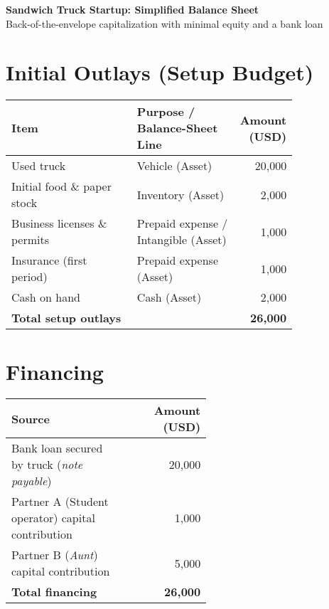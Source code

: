 \documentclass[11pt]{article}
\begin{document}
{\LARGE \textbf{Sandwich Truck Startup: Simplified Balance Sheet}}\\
{\large Back-of-the-envelope capitalization with minimal equity and a bank loan}

\section*{Initial Outlays (Setup Budget)}
\begin{tabular}{@{}p{0.44\linewidth}p{0.36\linewidth}r@{}}
\toprule
\textbf{Item} & \textbf{Purpose / Balance-Sheet Line} & \textbf{Amount (USD)}\\
\midrule
Used truck & Vehicle (Asset) & 20{,}000\\
Initial food \& paper stock & Inventory (Asset) & 2{,}000\\
Business licenses \& permits & Prepaid expense / Intangible (Asset) & 1{,}000\\
Insurance (first period) & Prepaid expense (Asset) & 1{,}000\\
Cash on hand & Cash (Asset) & 2{,}000\\
\midrule
\textbf{Total setup outlays} & & \textbf{26{,}000}\\
\bottomrule
\end{tabular}

\section*{Financing}
\begin{tabular}{@{}p{0.56\linewidth}r@{}}
\toprule
\textbf{Source} & \textbf{Amount (USD)}\\
\midrule
Bank loan secured by truck (\emph{note payable}) & 20{,}000\\
Partner A (Student operator) capital contribution & 1{,}000\\
Partner B (\emph{Aunt}) capital contribution & 5{,}000\\
\midrule
\textbf{Total financing} & \textbf{26{,}000}\\
\bottomrule
\end{tabular}
\end{document}
